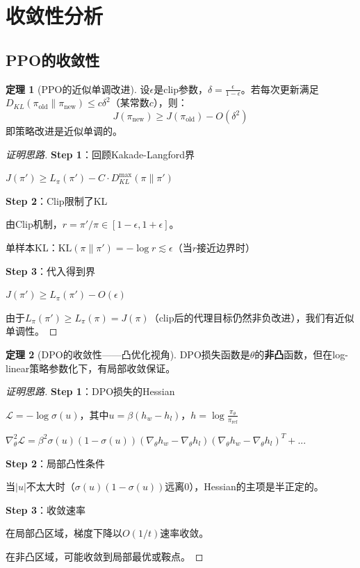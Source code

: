 \documentclass[11pt,a4paper]{article}
\theoremstyle{definition}
\newtheorem{theorem}{定理}[section]
\begin{document}
\section{收敛性分析}

\subsection{PPO的收敛性}

\begin{theorem}[PPO的近似单调改进]
设$\epsilon$是clip参数，$\delta = \frac{\epsilon}{1-\epsilon}$。若每次更新满足$D_{KL}(\pi_{\text{old}} \| \pi_{\text{new}}) \leq c\delta^2$（某常数$c$），则：
\[
J(\pi_{\text{new}}) \geq J(\pi_{\text{old}}) - O(\delta^2)
\]
即策略改进是近似单调的。
\end{theorem}

\begin{proof}[证明思路]
\textbf{Step 1}：回顾Kakade-Langford界

$J(\pi') \geq L_\pi(\pi') - C \cdot D_{KL}^{\max}(\pi \| \pi')$

\textbf{Step 2}：Clip限制了KL

由Clip机制，$r = \pi'/\pi \in [1-\epsilon, 1+\epsilon]$。

单样本KL：$\text{KL}(\pi \| \pi') = -\log r \lesssim \epsilon$（当$r$接近边界时）

\textbf{Step 3}：代入得到界

$J(\pi') \geq L_\pi(\pi') - O(\epsilon)$

由于$L_\pi(\pi') \geq L_\pi(\pi) = J(\pi)$（clip后的代理目标仍然非负改进），我们有近似单调性。
\end{proof}

\begin{theorem}[DPO的收敛性——凸优化视角]
DPO损失函数是$\theta$的\textbf{非凸}函数，但在log-linear策略参数化下，有局部收敛保证。
\end{theorem}

\begin{proof}[证明思路]
\textbf{Step 1}：DPO损失的Hessian

$\mathcal{L} = -\log \sigma(u)$，其中$u = \beta(h_w - h_l)$，$h = \log \frac{\pi_\theta}{\pi_{\text{ref}}}$

$\nabla^2_\theta \mathcal{L} = \beta^2 \sigma(u)(1-\sigma(u)) (\nabla_\theta h_w - \nabla_\theta h_l)(\nabla_\theta h_w - \nabla_\theta h_l)^T + ...$

\textbf{Step 2}：局部凸性条件

当$|u|$不太大时（$\sigma(u)(1-\sigma(u))$远离0），Hessian的主项是半正定的。

\textbf{Step 3}：收敛速率

在局部凸区域，梯度下降以$O(1/t)$速率收敛。

在非凸区域，可能收敛到局部最优或鞍点。
\end{proof}
\end{document}
